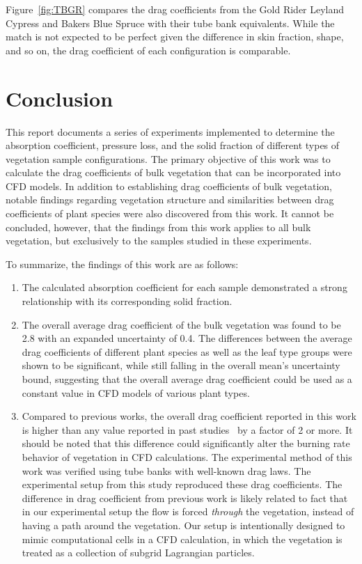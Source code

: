 \documentclass[12pt]{article}
\begin{document}
Figure~\ref{fig:TBGR} compares the drag coefficients from the Gold Rider Leyland Cypress and Bakers Blue Spruce with their tube bank equivalents. While the match is not expected to be perfect given the difference in skin fraction, shape, and so on, the drag coefficient of each configuration is comparable.
\pagebreak

\section{Conclusion}

This report documents a series of experiments implemented to determine the absorption coefficient, pressure loss, and the solid fraction of different types of vegetation sample configurations. The primary objective of this work was to calculate the drag coefficients of bulk vegetation that can be incorporated into CFD models. In addition to establishing drag coefficients of bulk  vegetation, notable findings regarding vegetation structure and similarities between drag coefficients of plant species were also discovered from this work. It cannot be concluded, however, that the findings from this work applies to all bulk vegetation, but exclusively to the samples studied in these experiments.

To summarize, the findings of this work are as follows:

\begin{enumerate}
  \item The calculated absorption coefficient for each sample demonstrated a strong relationship with its corresponding solid fraction.
  \item The overall average drag coefficient of the bulk vegetation was found to be 2.8 with an expanded uncertainty of 0.4. The differences between the average drag coefficients of different plant species as well as the leaf type groups were shown to be significant, while still falling in the overall mean's uncertainty bound, suggesting that the overall average drag coefficient could be used as a constant value in CFD models of various plant types.
\item Compared to previous works, the overall drag coefficient reported in this work is higher than any value reported in past studies~\cite{Cao2012,Jalonen2014,Mayhead1973,Gillies2002,Ishikawa2006} by a factor of 2 or more.  It should be noted that this difference could significantly alter the burning rate behavior of vegetation in CFD calculations. The experimental method of this work was verified using tube banks with well-known drag laws.  The experimental setup from this study reproduced these drag coefficients.  The difference in drag coefficient from previous work is likely related to fact that in our experimental setup the flow is forced \emph{through} the vegetation, instead of having a path around the vegetation.  Our setup is intentionally designed to mimic computational cells in a CFD calculation, in which the vegetation is treated as a collection of subgrid Lagrangian particles.
\end{enumerate}
\end{document}
